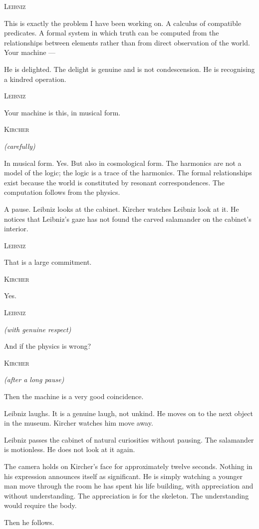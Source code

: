 \documentclass[12pt, a4paper, twoside]{memoir}
\theoremstyle{definition}
\theoremstyle{remark}
\newenvironment{action}{%
  \vspace{4pt}%
  \noindent\begin{minipage}{\linewidth}%
  \setlength{\parindent}{0pt}%
  \itshape\color{kircherink}%
}{%
  \end{minipage}\vspace{6pt}%
}
\newenvironment{dialogue}[1]{%
  \vspace{6pt}%
  \noindent\hspace{24mm}%
  \begin{minipage}{0.6\linewidth}%
  \begin{center}%
  {\small\textsc{#1}}%
  \end{center}%
  \vspace{2pt}%
}{%
  \end{minipage}\vspace{6pt}%
}
\newcommand{\paren}[1]{%
  \begin{center}%
  \small\itshape\color{plaguegrey}(#1)%
  \end{center}%
}
\begin{document}
\begin{dialogue}{Leibniz}
This is exactly the problem I have been working on. A calculus of compatible predicates. A formal system in which truth can be computed from the relationships between elements rather than from direct observation of the world. Your machine ---
\end{dialogue}

\begin{action}
He is delighted. The delight is genuine and is not condescension. He is recognising a kindred operation.
\end{action}

\begin{dialogue}{Leibniz}
Your machine is this, in musical form.
\end{dialogue}

\begin{dialogue}{Kircher}
\paren{carefully}
In musical form. Yes. But also in cosmological form. The harmonics are not a model of the logic; the logic is a trace of the harmonics. The formal relationships exist because the world is constituted by resonant correspondences. The computation follows from the physics.
\end{dialogue}

\begin{action}
A pause. Leibniz looks at the cabinet. Kircher watches Leibniz look at it. He notices that Leibniz's gaze has not found the carved salamander on the cabinet's interior.
\end{action}

\begin{dialogue}{Leibniz}
That is a large commitment.
\end{dialogue}

\begin{dialogue}{Kircher}
Yes.
\end{dialogue}

\begin{dialogue}{Leibniz}
\paren{with genuine respect}
And if the physics is wrong?
\end{dialogue}

\begin{dialogue}{Kircher}
\paren{after a long pause}
Then the machine is a very good coincidence.
\end{dialogue}

\begin{action}
Leibniz laughs. It is a genuine laugh, not unkind. He moves on to the next object in the museum. Kircher watches him move away.

Leibniz passes the cabinet of natural curiosities without pausing. The salamander is motionless. He does not look at it again.

The camera holds on Kircher's face for approximately twelve seconds. Nothing in his expression announces itself as significant. He is simply watching a younger man move through the room he has spent his life building, with appreciation and without understanding. The appreciation is for the skeleton. The understanding would require the body.

Then he follows.
\end{action}
\end{document}
